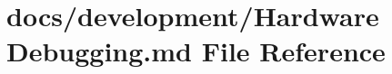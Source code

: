 \hypertarget{Hardware_01Debugging_8md}{\section{docs/development/\+Hardware Debugging.\+md File Reference}
\label{Hardware_01Debugging_8md}
}
